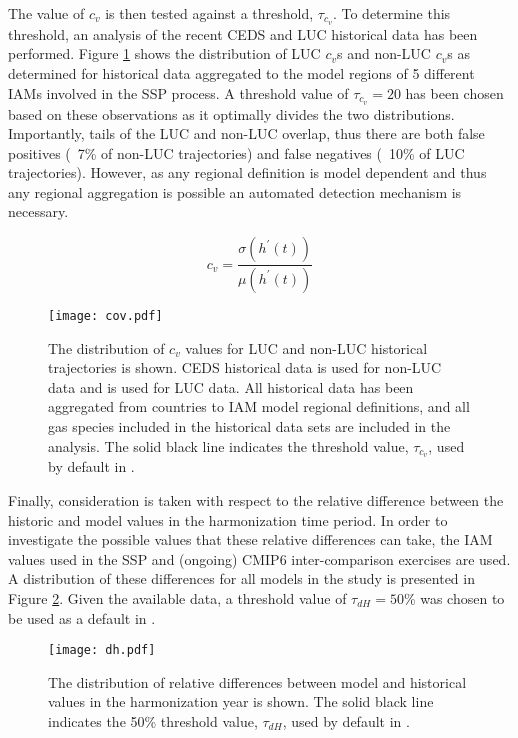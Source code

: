 The value of $c_v$ is then tested against a threshold, $\tau_{c_v}$. To
determine this threshold, an analysis of the recent CEDS and LUC historical data
has been performed. Figure \ref{fig:cov} shows the distribution of LUC $c_v$s
and non-LUC $c_v$s as determined for historical data aggregated to the model
regions of 5 different IAMs involved in the SSP process. A threshold value of
$\tau_{c_v} = 20$ has been chosen based on these observations as it
optimally divides the two distributions. Importantly, tails of the LUC and
non-LUC overlap, thus there are both false positives (~7\% of non-LUC
trajectories) and false negatives (~10\% of LUC trajectories). However, as any
regional definition is model dependent and thus any regional aggregation is
possible an automated detection mechanism is necessary.

\begin{equation}\label{eqs:cov}
    c_v =  \frac{\sigma(h^{\prime}(t))}{\mu(h^{\prime}(t))}
\end{equation}


\begin{figure}
  \begin{center}
    \texttt{[image: cov.pdf]}
    \caption[]{
      \label{fig:cov}
      The distribution of $c_v$ values for LUC and non-LUC historical
      trajectories is shown. CEDS historical data \cite{hoesly_historical_2017}
      is used for non-LUC data and \cite{van_marle_historic_2017} is used for
      LUC data. All historical data has been aggregated from countries to IAM
      model regional definitions, and all gas species included in the historical
      data sets are included in the analysis. The solid black line indicates the
      threshold value, $\tau_{c_v}$, used by default in .  }
  \end{center}
\end{figure}

Finally, consideration is taken with respect to the relative difference between
the historic and model values in the harmonization time period. In order to
investigate the possible values that these relative differences can take, the
IAM values used in the SSP and (ongoing) CMIP6 inter-comparison
exercises are used. A distribution of these differences for all models in the
study is presented in Figure \ref{fig:dh}. Given the available data, a threshold
value of $\tau_{dH} = 50$\% was chosen to be used as a default in .

\begin{figure}
  \begin{center}
    \texttt{[image: dh.pdf]}
    \caption[]{
      \label{fig:dh}
      The distribution of relative differences between model and historical
      values in the harmonization year is shown. The solid black line indicates
      the 50\% threshold value, $\tau_{dH}$, used by default in .
    }
  \end{center}
\end{figure}

